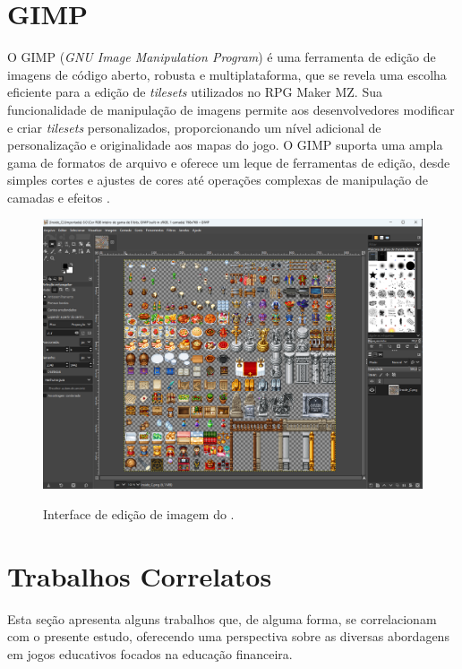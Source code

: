 \newpage

\section{GIMP}

O GIMP (\textit{GNU Image Manipulation Program}) é uma ferramenta de edição de imagens de código aberto, robusta e multiplataforma, que se revela uma escolha eficiente para a edição de \textit{tilesets} utilizados no RPG Maker MZ. Sua funcionalidade de manipulação de imagens permite aos desenvolvedores modificar e criar \textit{tilesets} personalizados, proporcionando um nível adicional de personalização e originalidade aos mapas do jogo. O GIMP suporta uma ampla gama de formatos de arquivo e oferece um leque de ferramentas de edição, desde simples cortes e ajustes de cores até operações complexas de manipulação de camadas e efeitos \cite{GIMP_Documentation}.

\begin{figure}[ht]
	\centering
	\caption{Interface de edição de imagem do \cite{GIMP_Documentation}.}
	\includegraphics[scale=0.4]{Textuais/Pictures/Gimp.png}
	\label{fig:gimp-interface}
\end{figure}

\section{Trabalhos Correlatos}
Esta seção apresenta alguns trabalhos que, de alguma forma, se correlacionam com o presente estudo, oferecendo uma perspectiva sobre as diversas abordagens em jogos educativos focados na educação financeira.

